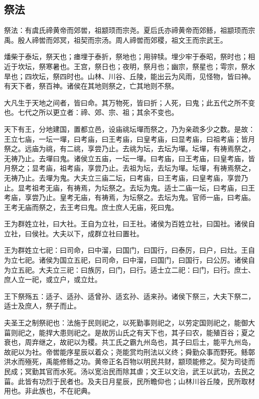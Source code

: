 \documentclass[]{article}
\begin{document}
\hypertarget{header-n625}{%
\subsection{祭法}\label{header-n625}}

祭法：有虞氏禘黄帝而郊喾，祖颛顼而宗尧。夏后氏亦禘黄帝而郊鲧，祖颛顼而宗禹。殷人禘喾而郊冥，祖契而宗汤。周人禘喾而郊稷，祖文王而宗武王。

燔柴于泰坛，祭天也；瘗埋于泰折，祭地也；用骍犊。埋少牢于泰昭，祭时也；相近于坎坛，祭寒暑也。王宫，祭日也；夜明，祭月也；幽宗，祭星也；雩宗，祭水旱也；四坎坛，祭四时也。山林、川谷、丘陵，能出云为风雨，见怪物，皆曰神。有天下者，祭百神。诸侯在其地则祭之，亡其地则不祭。

大凡生于天地之间者，皆曰命。其万物死，皆曰折；人死，曰鬼；此五代之所不变也。七代之所以更立者：禘、郊、宗、祖；其余不变也。

天下有王，分地建国，置都立邑，设庙祧坛墠而祭之，乃为亲疏多少之数。是故：王立七庙，一坛一墠，曰考庙，曰王考庙，曰皇考庙，曰显考庙，曰祖考庙；皆月祭之。远庙为祧，有二祧，享尝乃止。去祧为坛，去坛为墠。坛墠，有祷焉祭之，无祷乃止。去墠曰鬼。诸侯立五庙，一坛一墠。曰考庙，曰王考庙，曰皇考庙，皆月祭之；显考庙，祖考庙，享尝乃止。去祖为坛，去坛为墠。坛墠，有祷焉祭之，无祷乃止。去墠为鬼。大夫立三庙二坛，曰考庙，曰王考庙，曰皇考庙，享尝乃止。显考祖考无庙，有祷焉，为坛祭之。去坛为鬼。适士二庙一坛，曰考庙，曰王考庙，享尝乃止。皇考无庙，有祷焉，为坛祭之。去坛为鬼。官师一庙，曰考庙。王考无庙而祭之，去王考曰鬼。庶士庶人无庙，死曰鬼。

王为群姓立社，曰大社。王自为立社，曰王社。诸侯为百姓立社，曰国社。诸侯自立社，曰侯社。大夫以下，成群立社曰置社。

王为群姓立七祀：曰司命，曰中溜，曰国门，曰国行，曰泰厉，曰户，曰灶。王自为立七祀。诸侯为国立五祀，曰司命，曰中溜，曰国门，曰国行，曰公厉。诸侯自为立五祀。大夫立三祀：曰族厉，曰门，曰行。适士立二祀：曰门，曰行。庶士、庶人立一祀，或立户，或立灶。

王下祭殇五：适子、适孙、适曾孙、适玄孙、适来孙。诸侯下祭三，大夫下祭二，适士及庶人，祭子而止。

夫圣王之制祭祀也：法施于民则祀之，以死勤事则祀之，以劳定国则祀之，能御大菑则祀之，能捍大患则祀之。是故厉山氏之有天下也，其子曰农，能殖百谷；夏之衰也，周弃继之，故祀以为稷。共工氏之霸九州岛也，其子曰后土，能平九州岛，故祀以为社。帝喾能序星辰以着众；尧能赏均刑法以义终；舜勤众事而野死。鲧鄣洪水而殛死，禹能修鲧之功。黄帝正名百物以明民共财，颛顼能修之。契为司徒而民成；冥勤其官而水死。汤以宽治民而除其虐；文王以文治，武王以武功，去民之菑。此皆有功烈于民者也。及夫日月星辰，民所瞻仰也；山林川谷丘陵，民所取材用也。非此族也，不在祀典。
\end{document}
